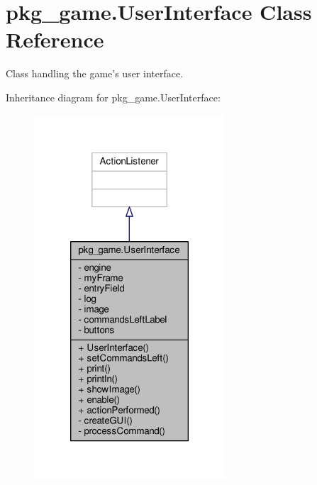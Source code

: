 \hypertarget{classpkg__game_1_1UserInterface}{\section{pkg\-\_\-game.\-User\-Interface Class Reference}
\label{classpkg__game_1_1UserInterface}
}


Class handling the game's user interface.  




Inheritance diagram for pkg\-\_\-game.\-User\-Interface\-:\nopagebreak
\begin{figure}[H]
\begin{center}
\leavevmode
\includegraphics[width=202pt]{classpkg__game_1_1UserInterface__inherit__graph}
\end{center}
\end{figure}


